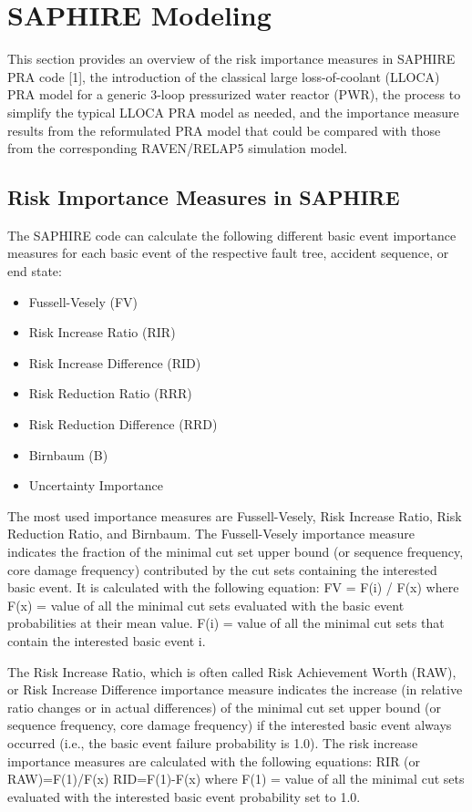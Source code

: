 \section{SAPHIRE Modeling}
\label{sec:SAPHIREmodeling}

This section provides an overview of the risk importance measures in SAPHIRE PRA 
code [1], the introduction of the classical large loss-of-coolant (LLOCA) PRA model 
for a generic 3-loop pressurized water reactor (PWR), the process to simplify the 
typical LLOCA PRA model as needed, and the importance measure results from the 
reformulated PRA model that could be compared with those from the corresponding 
RAVEN/RELAP5 simulation model. 

\subsection{Risk Importance Measures in SAPHIRE}

The SAPHIRE code can calculate the following different basic event importance 
measures for each basic event of the respective fault tree, accident sequence, 
or end state:
\begin{itemize}
	\item Fussell-Vesely (FV) 
	\item Risk Increase Ratio (RIR) 
	\item Risk Increase Difference (RID)
	\item Risk Reduction Ratio (RRR)
	\item Risk Reduction Difference (RRD)
	\item Birnbaum (B)
	\item Uncertainty Importance
\end{itemize}
The most used importance measures are Fussell-Vesely, Risk Increase Ratio, Risk 
Reduction Ratio, and Birnbaum. The Fussell-Vesely importance measure indicates 
the fraction of the minimal cut set upper bound (or sequence frequency, core damage 
frequency) contributed by the cut sets containing the interested basic event. 
It is calculated with the following equation:
FV = F(i) / F(x)
where F(x) = value of all the minimal cut sets evaluated with the basic event probabilities at their mean value.
    F(i) = value of all the minimal cut sets that contain the interested basic event i.

The Risk Increase Ratio, which is often called Risk Achievement Worth (RAW), or Risk 
Increase Difference importance measure indicates the increase (in relative ratio 
changes or in actual differences) of the minimal cut set upper bound (or sequence 
frequency, core damage frequency) if the interested basic event always occurred 
(i.e., the basic event failure probability is 1.0). 
The risk increase importance measures are calculated with the following equations:
RIR (or RAW)=F(1)/F(x)
RID=F(1)-F(x)
where F(1) = value of all the minimal cut sets evaluated with the interested basic event probability set to 1.0.

